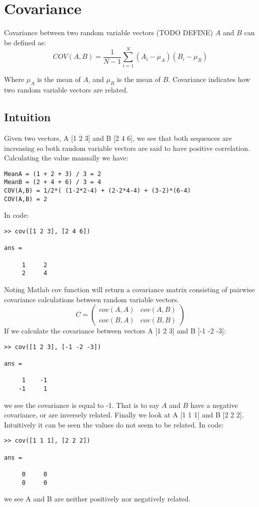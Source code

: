 \section{Covariance}
Covariance between two random variable vectors (TODO DEFINE) $A$ and $B$ can be defined as:
\begin{equation}
COV(A,B)=\frac{1}{N-1}\sum_{i=1}^N(A_i-\mu_A)(B_i-\mu_B)   \label{covariance}
\end{equation}


Where $\mu_A$ is the mean of $A$, and $\mu_B$ is the mean of $B$. Covariance indicates how two random variable vectors are related.
\subsection{Intuition}
Given two vectors, A [1 2 3] and B [2 4 6], we see that both sequences are increasing so both random variable vectors are said to have positive correlation. Calculating the value manually we have:
\begin{verbatim}
MeanA = (1 + 2 + 3) / 3 = 2
MeanB = (2 + 4 + 6) / 3 = 4
COV(A,B) = 1/2*( (1-2*2-4) + (2-2*4-4) + (3-2)*(6-4)
COV(A,B) = 2
\end{verbatim}
In code:
\begin{verbatim}
>> cov([1 2 3], [2 4 6])

ans =

     1     2
     2     4
\end{verbatim}
Noting Matlab cov function will return a covariance matrix consisting of pairwise covariance calculations between random variable vectors.
$$
C = 
\begin{pmatrix}
cov(A,A) & cov(A,B)\\
cov(B,A) & cov(B,B)
\end{pmatrix}
$$
If we calculate the covariance between vectors A [1 2 3] and B [-1 -2 -3]:
\begin{verbatim}
>> cov([1 2 3], [-1 -2 -3])

ans =

     1    -1
    -1     1    
\end{verbatim}
we see the covariance is equal to -1. That is to say $A$ and $B$ have a negative covariance, or are inversely related.
Finally we look at A [1 1 1] and B [2 2 2]. Intuitively it can be seen the values do not seem to be related. In code:
\begin{verbatim}
>> cov([1 1 1], [2 2 2])

ans =

     0     0
     0     0
\end{verbatim}
we see A and B are neither positively nor negatively related.